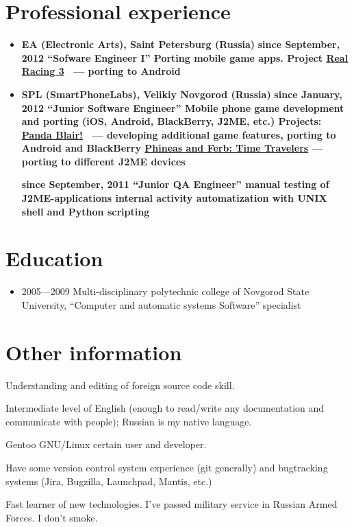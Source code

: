 \section{Professional experience}
\begin{itemize}
\item {
\fontsize{14pt}{14pt}\selectfont
\bfseries EA (Electronic Arts)\mdseries, Saint Petersburg (Russia)
}
\subitem \bfseries since September, 2012 ``Sofware Engineer I''\mdseries
\subsubitem Porting mobile game apps.
\subsubitem Project \href{http://www.facebook.com/realracing}{Real Racing 3} \
--- porting to Android

\item {
\fontsize{14pt}{14pt}\selectfont
\bfseries SPL (SmartPhoneLabs)\mdseries, Velikiy Novgorod (Russia)
}
\subitem \bfseries since January, 2012 ``Junior Software Engineer''\mdseries
\subsubitem Mobile phone game development and porting
(iOS, Android, BlackBerry, J2ME, etc.)
\subsubitem Projects:
\subsubitem\href{https://itunes.apple.com/us/app/panda-blair!/id500995558?mt=8}{Panda Blair!} \
--- developing additional game features, porting to Android and BlackBerry
\subsubitem\href{http://java.mob.org/game/phineas\_and\_ferb\_time\_travelers.html}{Phineas and Ferb: Time Travelers} --- porting to different J2ME devices

\subitem \bfseries since September, 2011 ``Junior QA Engineer''\mdseries
\subsubitem manual testing of J2ME-applications
\subsubitem internal activity automatization with UNIX shell and Python scripting
\end{itemize}

\section{Education}
\begin{itemize}
\item 2005---2009 Multi-disciplinary polytechnic college of
Novgorod State University,
``Computer and automatic systems Software'' specialist
\end{itemize}

\section{Other information}
Understanding and editing of foreign source code skill.

Intermediate level of English
(enough to read/write any documentation and communicate with people);
Russian is my native language.

Gentoo GNU/Linux certain user and developer.

Have some version control system experience (git generally) and
bugtracking systems (Jira, Bugzilla, Launchpad, Mantis, etc.)

Fast learner of new technologies.
I've passed military service in Russian Armed Forces.
I don't smoke.
